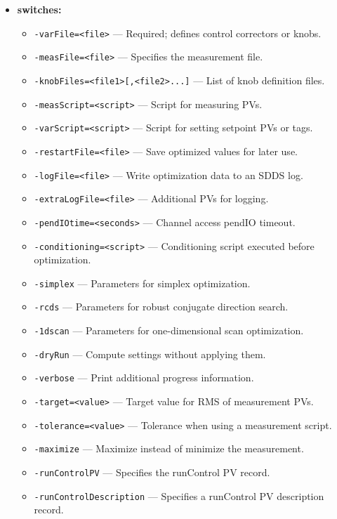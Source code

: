 \begin{itemize}
%
\item {\bf switches:}
%
%
    \begin{itemize}
%
%
        \item {\tt -varFile=<file>} --- Required; defines control correctors or knobs.
        \item {\tt -measFile=<file>} --- Specifies the measurement file.
        \item {\tt -knobFiles=<file1>[,<file2>...]} --- List of knob definition files.
        \item {\tt -measScript=<script>} --- Script for measuring PVs.
        \item {\tt -varScript=<script>} --- Script for setting setpoint PVs or tags.
        \item {\tt -restartFile=<file>} --- Save optimized values for later use.
        \item {\tt -logFile=<file>} --- Write optimization data to an SDDS log.
        \item {\tt -extraLogFile=<file>} --- Additional PVs for logging.
        \item {\tt -pendIOtime=<seconds>} --- Channel access pendIO timeout.
        \item {\tt -conditioning=<script>} --- Conditioning script executed before optimization.
        \item {\tt -simplex} --- Parameters for simplex optimization.
        \item {\tt -rcds} --- Parameters for robust conjugate direction search.
        \item {\tt -1dscan} --- Parameters for one-dimensional scan optimization.
        \item {\tt -dryRun} --- Compute settings without applying them.
        \item {\tt -verbose} --- Print additional progress information.
        \item {\tt -target=<value>} --- Target value for RMS of measurement PVs.
        \item {\tt -tolerance=<value>} --- Tolerance when using a measurement script.
        \item {\tt -maximize} --- Maximize instead of minimize the measurement.
        \item {\tt -runControlPV} --- Specifies the runControl PV record.
        \item {\tt -runControlDescription} --- Specifies a runControl PV description record.

\end{itemize}
\end{itemize}
